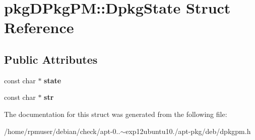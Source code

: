 \section{pkg\-D\-Pkg\-P\-M\-:\-:\-Dpkg\-State \-Struct \-Reference}
\label{structpkgDPkgPM_1_1DpkgState}
\subsection*{\-Public \-Attributes}
\begin{DoxyCompactItemize}
\item 
const char $\ast$ {\bfseries state}\label{structpkgDPkgPM_1_1DpkgState_a2417314f8d1d56a2761bc79c2f89e571}

\item 
const char $\ast$ {\bfseries str}\label{structpkgDPkgPM_1_1DpkgState_af25d6dc49269fa2003ac7c7fa6f13915}

\end{DoxyCompactItemize}


\-The documentation for this struct was generated from the following file\-:\begin{DoxyCompactItemize}
\item 
/home/rpmuser/debian/check/apt-\/0..$\sim$exp12ubuntu10./apt-\/pkg/deb/dpkgpm.\-h\end{DoxyCompactItemize}
